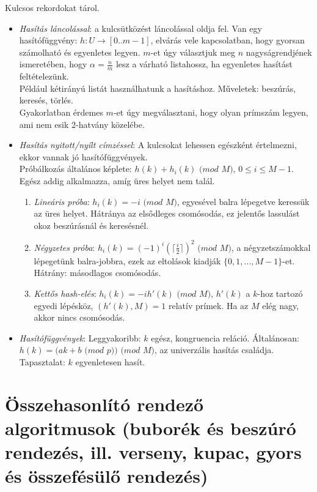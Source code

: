 \documentclass[margin=0px]{article}
\begin{document}
	Kulcsos rekordokat tárol.
	\begin{itemize}
		\item \textit{Hasítás láncolással}: a kulcsütközést láncolással oldja fel. Van egy hasítófüggvény: $h: U \to [0..m-1]$, elvárás vele kapcsolatban, hogy gyorsan számolható és egyenletes legyen. $m$-et úgy választjuk meg $n$ nagyságrendjének ismeretében, hogy $\alpha = \frac{n}{m}$ lesz a várható listahossz, ha egyenletes hasítást feltételezünk.\\
		Például kétirányú listát használhatunk a hasításhoz. Műveletek: beszúrás, keresés, törlés. \\
		Gyakorlatban érdemes $m$-et úgy megválasztani, hogy olyan prímszám legyen, ami nem esik 2-hatvány közelébe.
		\item \textit{Hasítás nyitott/nyílt címzéssel}: A kulcsokat lehessen egészként értelmezni, ekkor vannak jó hasítófüggvények. \\
		Próbálkozás általános képlete: $h(k) + h_i(k)$ $(mod$ $M)$, $0 \leq i \leq M-1$. Egész addig alkalmazza, amíg üres helyet nem talál.
		\begin{enumerate}
			\item \textit{Lineáris próba}: $h_i(k) = -i$ $(mod$ $M)$, egyesével balra lépegetve keressük az üres helyet. Hátránya az elsődleges csomósodás, ez jelentős lassulást okoz beszúrásnál és keresésnél.
			\item \textit{Négyzetes próba}: $h_i(k) = (-1)^i(\lceil\frac{i}{2}\rceil)^2$ $(mod$ $M)$, a négyzetszámokkal lépegetünk balra-jobbra, ezek az eltolások kiadják $\{0,1,...,M-1\}$-et. Hátrány: másodlagos csomósodás.
			\item \textit{Kettős hash-elés}: $h_i(k) =-ih'(k)$ $(mod$ $M)$, $h'(k)$ a $k$-hoz tartozó egyedi lépésköz, $(h'(k),M)=1$ relatív prímek. Ha az $M$ elég nagy, akkor nincs csomósodás.
		\end{enumerate}
		\item \textit{Hasítófüggvények}: Leggyakoribb: $k$ egész, kongruencia reláció. Általánosan: $h(k) = (ak +b$ $(mod$ $p))$ $(mod$ $M)$, az univerzális hasítás családja. Tapasztalat: $k$ egyenletesen hasít.
	\end{itemize}
	
	\section{Összehasonlító rendező algoritmusok (buborék és beszúró rendezés, ill. verseny, kupac, gyors és összefésülő rendezés)}
	
\end{document}
